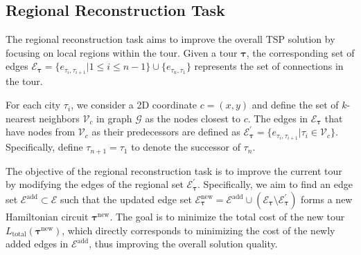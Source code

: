 \subsection{Regional Reconstruction Task}
The regional reconstruction task aims to improve the overall TSP solution by focusing on local regions within the tour. Given a tour $\boldsymbol{\tau}$, the corresponding set of edges $\mathcal{E}_{\boldsymbol{\tau}}=\{e_{\tau_{i},\tau_{i+1}} | 1\leq i \leq n-1\} \cup \{e_{\tau_{n},\tau_{1}}\}$ represents the set of connections in the tour. 

For each city $\tau_i$, we consider a 2D coordinate $c = (x, y)$ and define the set of $k$-nearest neighbors $\mathcal{V}_{c}$ in graph $\mathcal{G}$ as the nodes closest to $c$.
The edges in $\mathcal{E}_{\boldsymbol{\tau}}$ that have nodes from $\mathcal{V}_{c}$ as their predecessors are defined as $\mathcal{E}_{\boldsymbol{\tau}}^{\prime}=\{e_{\tau_{i},\tau_{i+1}} | \tau_{i} \in \mathcal{V}_{c}\}$. Specifically, define $\tau_{n+1}=\tau_{1}$ to denote the successor of $\tau_{n}$. 

The objective of the regional reconstruction task is to improve the current tour by modifying the edges of the regional set $\mathcal{E}_{\boldsymbol{\tau}}^{\prime}$.  
Specifically, we aim to find an edge set $\mathcal{E}^{\text{add}} \subset \mathcal{E}$ such that the updated edge set $\mathcal{E}_{\boldsymbol{\tau}}^{\text{new}} = \mathcal{E}^{\text{add}} \cup (\mathcal{E}_{\boldsymbol{\tau}} \setminus \mathcal{E}_{\boldsymbol{\tau}}^{\prime})$ forms a new Hamiltonian circuit $\boldsymbol{\tau}^\text{new}$. The goal is to minimize the total cost of the new tour $L_{\text{total}}(\boldsymbol{\tau}^\text{new})$, 
which directly corresponds to minimizing the cost of the newly added edges in $\mathcal{E}^{\text{add}}$, thus improving the overall solution quality.
